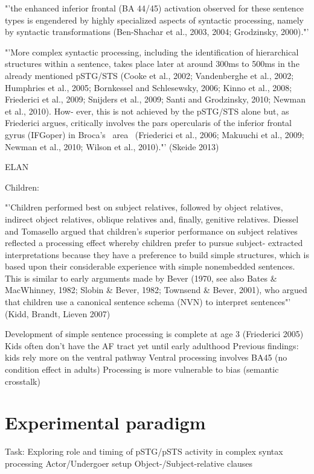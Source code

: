 "'the enhanced inferior frontal (BA 44/45) activation observed for these sentence types is engendered by highly specialized aspects of syntactic processing, namely by syntactic transformations (Ben-Shachar et al., 2003, 2004; Grodzinsky, 2000)."'

 "'More complex syntactic processing, 
 including the identification of hierarchical structures within a sentence, takes 
 place later at around 300ms to 500ms in the already mentioned pSTG/STS 
 (Cooke et al., 2002; Vandenberghe et al., 2002; Humphries et al., 2005; 
 Bornkessel and Schlesewsky, 2006; Kinno et al., 2008; Friederici et al., 2009; 
 Snijders et al., 2009; Santi and Grodzinsky, 2010; Newman et al., 2010). How-
 ever, this is not achieved by the pSTG/STS alone but, as Friederici argues, 
 critically involves the pars opercularis of the inferior frontal gyrus (IFGoper) in 
 Broca's  area  (Friederici et al., 2006; Makuuchi et al., 2009; Newman et al., 
 2010; Wilson et al., 2010)."' (Skeide 2013)

 ELAN

Children:

"'Children
 performed best on subject relatives, followed by object relatives, indirect
 object relatives, oblique relatives and, finally, genitive relatives. Diessel and
 Tomasello argued that children's superior performance on subject relatives
 reflected a processing effect whereby children prefer to pursue subject-
 extracted interpretations because they have a preference to build simple
 structures, which is based upon their considerable experience with simple
 nonembedded sentences. This is similar to early arguments made by Bever
 (1970, see also Bates \& MacWhinney, 1982; Slobin \& Bever, 1982; Townsend
 \& Bever, 2001), who argued that children use a canonical sentence schema
 (NVN) to interpret sentences"' (Kidd, Brandt, Lieven 2007)

Development of simple sentence processing is complete at age 3 (Friederici 2005)
Kids often don't have the AF tract yet until early adulthood
Previous findings: kids rely more on the ventral pathway
Ventral processing involves BA45 (no condition effect in adults)
Processing is more vulnerable to bias (semantic crosstalk)

\section{Experimental paradigm}

Task: Exploring role and timing of pSTG/pSTS activity in complex syntax processing
Actor/Undergoer setup
Object-/Subject-relative clauses

